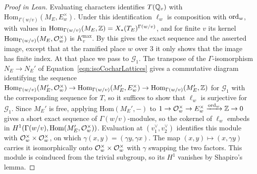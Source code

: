 \begin{proof}[Proof in Lean]

\leanok


Evaluating characters identifies $T(\mathbb{Q}_v)$ with $\mathrm{Hom}_{\Gamma(w/v)}(M_E,E_w^\times)$. Under this identification $\ell_w$ is composition with $\mathrm{ord}_w$, with values in $\mathrm{Hom}_{\Gamma(w/v)}(M_E,\mathbb{Z})=X_\ast(T_E)^{\Gamma(w/v)}$, and for finite $v$ its kernel $\mathrm{Hom}_{\Gamma(w/v)}(M_E,\mathcal{O}_w^\times)$ is $K_v^{\mathrm{max}}$. By \cite[(1.3), p.~449]{MR291099} this gives the exact sequence and the asserted image, except that at the ramified place $w$ over $3$ it only shows that the image has finite index. At that place we pass to $\mathcal G_1$. The transpose of the $\Gamma$-isomorphism $N_E\to N_E'$ of Equation~\ref{eqn:isoCocharLattices} gives a commutative diagram identifying the sequence $\mathrm{Hom}_{\Gamma(w/v)}(M_E',\mathcal{O}_w^\times)\to\mathrm{Hom}_{\Gamma(w/v)}(M_E',E_w^\times)\to\mathrm{Hom}_{\Gamma(w/v)}(M_E',\mathbb{Z})$ for $\mathcal G_1$ with the corresponding sequence for $T$, so it suffices to show that $\ell_w$ is surjective for $\mathcal G_1$. Since $M_E'$ is free, applying $\mathrm{Hom}(M_E',-)$ to $1\to\mathcal{O}_w^\times\to E_w^\times\xrightarrow{\mathrm{ord}_w}\mathbb{Z}\to0$ gives a short exact sequence of $\Gamma(w/v)$-modules, so the cokernel of $\ell_w$ embeds in $H^1(\Gamma(w/v),\mathrm{Hom}(M_E',\mathcal{O}_w^\times))$. Evaluation at $(v_1^\vee,v_2^\vee)$ identifies this module with $\mathcal{O}_w^\times\times\mathcal{O}_w^\times$, on which $\gamma(x,y)=(\gamma y,\gamma x)$. The map $(x,y)\mapsto(x,\gamma y)$ carries it isomorphically onto $\mathcal{O}_w^\times\times\mathcal{O}_w^\times$ with $\gamma$ swapping the two factors. This module is coinduced from the trivial subgroup, so its $H^1$ vanishes by Shapiro's lemma.

\end{proof}

